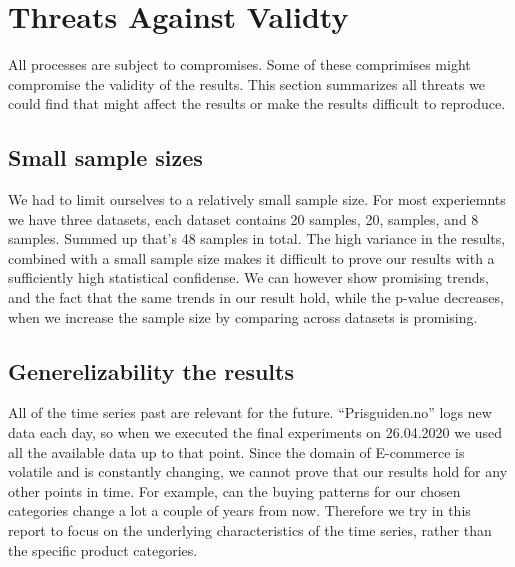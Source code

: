 \section{Threats Against Validty}
\label{section:Discussion:Threats}
All processes are subject to compromises. Some of these comprimises might compromise the validity of
the results. This section summarizes all threats we could find that might affect the results or make
the results difficult to reproduce.

\subsection{Small sample sizes}
We had to limit ourselves to a relatively small sample size. For most experiemnts we have
three datasets, each dataset contains 20 samples, 20, samples, and 8 samples.
Summed up that's 48 samples in total. The high variance in the results, combined with a small sample size
makes it difficult to prove our results with a sufficiently high statistical confidense.
We can however show promising trends, and the fact that the same trends in our result hold, while
the p-value decreases, when
we increase the sample size by comparing across datasets is promising.




\subsection{Generelizability the results}
All of the time series past are relevant for the future. ``Prisguiden.no'' logs new data each day,
so when we executed the final experiments on 26.04.2020 we used all the available data up to that point.
Since the domain of E-commerce is volatile and is constantly changing, we cannot prove that our
results hold for any other points in time. For example, can the buying patterns for our chosen categories
change a lot a couple of years from now.
Therefore we try in this report to focus on the underlying characteristics of the time series, rather than
the specific product categories.



